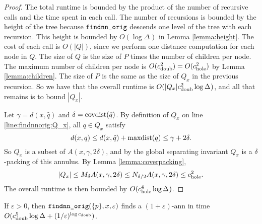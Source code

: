 \documentclass[thesis.tex]{subfiles}
\newcommand{\dist}[2]{\distf({#1},{#2})}
\newcommand{\distf}{d}
\newcommand{\aspect}[1]{\Delta_{#1}}
\newcommand{\cdoub}{c_\textnormal{doub}}
\newcommand{\chole}{c_\textnormal{hole}}
\newcommand{\eann}{(1+\varepsilon)\text{-ann}}
\newcommand{\mkfunction}[1]{\ifmmode{\textnormal{{#1}}}}
\newcommand{\covdist}[1]    {\mkfunction{covdist}({#1})}
\newcommand{\maxdist}[1]    {\mkfunction{maxdist}({#1})}
\newcommand{\mkprocedure}[1]{\textnormal{\ttfamily {#1}}}
\newcommand{\findnnorig}{\mkprocedure{findnn\_orig}}
\begin{document}
\begin{proof}
    The total runtime is bounded by the product of the number of recursive calls and the time spent in each call.
    The number of recursions is bounded by the height of the tree because $\findnnorig$ descends one level of the tree with each recursion.
    This height is bounded by $O(\log\aspect{})$ in Lemma \ref{lemma:height}.
    The cost of each call is $O(|Q|)$,
    since we perform one distance computation for each node in $Q$.
    The size of $Q$ is the size of $P$ times the number of children per node.
    The maximum number of children per node is $O(\cdoub^2) = O(\chole^2)$ by Lemma \ref{lemma:children}.
    The size of $P$ is the same as the size of $Q_x$ in the previous recursion.
    So we have that the overall runtime is $O(|Q_x|\cdoub^2\log\aspect{})$,
    and all that remains is to bound $|Q_x|$.

    Let $\gamma=\dist{x}{\hat q}$ and $\delta=\covdist{\hat q}$.
    By definition of $Q_x$ on line \ref{line:findnnorig:Q_x}, all $q\in Q_x$ satisfy
    \begin{equation}
        \dist{x}{q} \le \dist{x}{\hat q} + \maxdist{q} \le \gamma+2\delta
        .
    \end{equation}
    So $Q_x$ is a subset of $A(x,\gamma,2\delta)$,
    and by the global separating invariant $Q_x$ is a $\delta$-packing of this annulus.
    By Lemma \ref{lemma:coverpacking},
    \begin{equation}
        |Q_x| 
        \le M_\delta A(x,\gamma,2\delta)     
        \le N_{\delta/2} A(x,\gamma,2\delta)
        \le \chole^2
        .
    \end{equation}
    The overall runtime is then bounded by $O(\chole^4\log\aspect{})$.
\end{proof}

\begin{theorem}
    \label{theorem:findnnorig:runtime:approx2}
    If $\varepsilon > 0$,
    then $\findnnorig(\{p\},x,\varepsilon)$ finds a $\eann$ in time $O(\cdoub^5\log\aspect{} + (1/\varepsilon)^{\log \cdoub})$.
\end{theorem}
\end{document}
